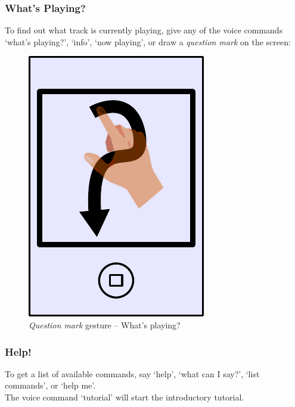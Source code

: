 \documentclass[12pt,letterpaper]{article}
\begin{document}
\subsubsection*{What's Playing?}
To find out what track is currently playing, give any of the voice commands `what's playing?', `info', `now playing',  or draw a \emph{question mark} on the screen:
\begin{figure}[H]
	\centering
	\includegraphics[scale=0.6]{question}
	\caption{\emph{Question mark} gesture -- What's playing?}
\end{figure}
\subsubsection*{Help!}
To get a list of available commands, say `help', `what can I say?', `list commands', or `help me'. \\
{\color{magenta}The voice command `tutorial' will start the introductory tutorial.}
\end{document}
